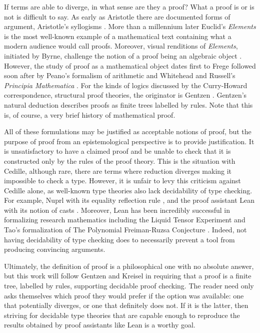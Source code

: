 If terms are able to diverge, in what sense are they a proof?
What a proof is or is not is difficult to say.
As early as Aristotle there are documented forms of argument, Aristotle's syllogisms \cite{aristotle}.
More than a millennium later Euclid's \textit{Elements} is the most well-known example of a mathematical text containing what a modern audience would call proofs.
Moreover, visual renditions of \textit{Elements}, initiated by Byrne, challenge the notion of a proof being an algebraic object \cite{byrne}.
However, the study of proof as a mathematical object dates first to Frege \cite{frege1879} followed soon after by Peano's formalism of arithmetic \cite{peano1889} and Whitehead and Russell's \textit{Principia Mathematica} \cite{whitehead}.
For the kinds of logics discussed by the Curry-Howard correspondence, structural proof theories, the originator is Gentzen \cite{gentzen1935_i,gentzen1935_ii}.
Gentzen's natural deduction describes proofs as finite trees labelled by rules.
Note that this is, of course, a very brief history of mathematical proof.

All of these formulations may be justified as acceptable notions of proof, but the purpose of proof from an epistemological perspective is to provide justification.
It is unsatisfactory to have a claimed proof and be unable to check that it is constructed only by the rules of the proof theory.
This is the situation with Cedille, although rare, there are terms where reduction diverges making it impossible to check a type.
However, it is unfair to levy this criticism against Cedille alone, as well-known type theories also lack decidability of type checking.
For example, Nuprl with its equality reflection rule \cite{allen2000}, and the proof assistant Lean with its notion of casts \cite{moura2021}.
Moreover, Lean has been incredibly successful in formalizing research mathematics including the Liquid Tensor Experiment \cite{liquid_tensor_experiment} and Tao's formalization of The Polynomial Freiman-Ruzsa Conjecture \cite{tao2024_pfr}.
Indeed, not having decidability of type checking does to necessarily prevent a tool from producing convincing arguments.

Ultimately, the definition of proof is a philosophical one with no absolute answer, but this work will follow Gentzen and Kreisel in requiring that a proof is a finite tree, labelled by rules, supporting decidable proof checking.
The reader need only asks themselves which proof they would prefer if the option was available: one that potentially diverges, or one that definitely does not.
If it is the latter, then striving for decidable type theories that are capable enough to reproduce the results obtained by proof assistants like Lean is a worthy goal.


